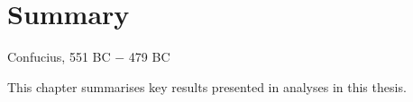 \chapter{Summary}
\label{chap:summary}



%
{Confucius, 551 BC $-$ 479 BC}





This chapter summarises key results presented in analyses in this thesis.


